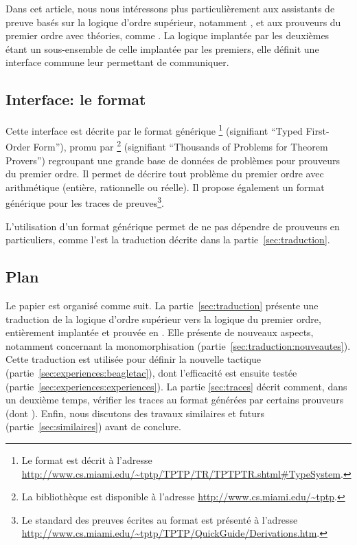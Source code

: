 Dans cet article, nous nous intéressons plus particulièrement aux
assistants de preuve basés sur la logique d'ordre supérieur, notamment
\holfour, et aux prouveurs du premier ordre avec théories, comme
\beagle. La logique implantée par les deuxièmes étant un sous-ensemble
de celle implantée par les premiers, elle définit une interface commune
leur permettant de communiquer.


\subsection{Interface: le format \tff}

Cette interface est décrite par le format générique \tff\footnote{Le
  format \tff est décrit à l'adresse
  \url{http://www.cs.miami.edu/~tptp/TPTP/TR/TPTPTR.shtml\#TypeSystem}.}
(signifiant ``Typed First-Order Form''), promu par \tptp\footnote{La
  bibliothèque \tptp est disponible à l'adresse
  \url{http://www.cs.miami.edu/~tptp}.} (signifiant ``Thousands of
Problems for Theorem Provers'') regroupant une grande base de données de
problèmes pour prouveurs du premier ordre. Il permet de décrire tout
problème du premier ordre avec arithmétique (entière, rationnelle ou
réelle). Il propose également un format générique pour les traces de
preuves\footnote{Le standard des preuves écrites au format \tff est présenté à l'adresse \url{http://www.cs.miami.edu/~tptp/TPTP/QuickGuide/Derivations.htm}.}.


L'utilisation d'un format générique permet de ne pas dépendre de
prouveurs en particuliers, comme l'est la traduction décrite dans la
partie~\ref{sec:traduction}.


\subsection{Plan}

Le papier est organisé comme suit. La partie~\ref{sec:traduction}
présente une traduction de la logique d'ordre supérieur vers la logique
du premier ordre, entièrement implantée et prouvée en \holfour. Elle
présente de nouveaux aspects, notamment concernant la monomorphisation
(partie~\ref{sec:traduction:nouveautes}). Cette traduction est utilisée
pour définir la nouvelle tactique \beagletac
(partie~\ref{sec:experiences:beagletac}), dont l'efficacité est ensuite
testée (partie~\ref{sec:experiences:experiences}). La partie
\ref{sec:traces} décrit comment, dans un deuxième temps, vérifier les
traces au format \tff générées par certains prouveurs (dont \beagle).
Enfin, nous discutons des travaux similaires et futurs
(partie~\ref{sec:similaires}) avant de conclure.





